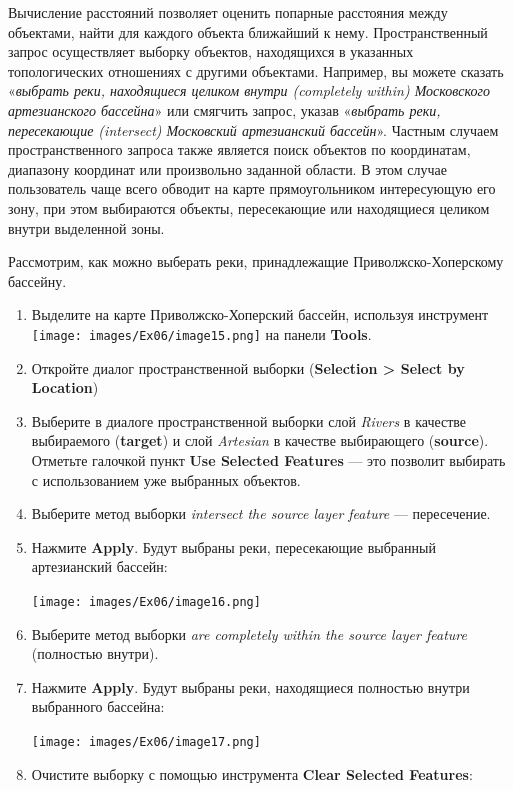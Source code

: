 \documentclass[12pt,]{book}
\begin{document}
Вычисление расстояний позволяет оценить попарные расстояния между объектами, найти для каждого объекта ближайший к нему. Пространственный запрос осуществляет выборку объектов, находящихся в указанных топологических отношениях с другими объектами. Например, вы можете сказать «\emph{выбрать реки, находящиеся целиком внутри (completely within) Московского артезианского бассейна}» или смягчить запрос, указав «\emph{выбрать реки, пересекающие (intersect) Московский артезианский бассейн}». Частным случаем пространственного запроса также является поиск объектов по координатам, диапазону координат или произвольно заданной области. В этом случае пользователь чаще всего обводит на карте прямоугольником интересующую его зону, при этом выбираются объекты, пересекающие или находящиеся целиком внутри выделенной зоны.

Рассмотрим, как можно выберать реки, принадлежащие Приволжско-Хоперскому бассейну.

\begin{enumerate}
\def\labelenumi{\arabic{enumi}.}
\item
  Выделите на карте Приволжско-Хоперский бассейн, используя инструмент \texttt{[image: images/Ex06/image15.png]} на панели \textbf{Tools}.
\item
  Откройте диалог пространственной выборки (\textbf{Selection \textgreater{} Select by Location})
\item
  Выберите в диалоге пространственной выборки слой \emph{Rivers} в качестве выбираемого (\textbf{target}) и слой \emph{Artesian} в качестве выбирающего (\textbf{source}). Отметьте галочкой пункт \textbf{Use Selected Features} --- это позволит выбирать с использованием уже выбранных объектов.
\item
  Выберите метод выборки \emph{intersect the source layer feature} --- пересечение.
\item
  Нажмите \textbf{Apply}. Будут выбраны реки, пересекающие выбранный артезианский бассейн:

  \texttt{[image: images/Ex06/image16.png]}
\item
  Выберите метод выборки \emph{are completely within the source layer feature} (полностью внутри).
\item
  Нажмите \textbf{Apply}. Будут выбраны реки, находящиеся полностью внутри выбранного бассейна:

  \texttt{[image: images/Ex06/image17.png]}
\item
  Очистите выборку с помощью инструмента \textbf{Clear Selected Features}:
\end{enumerate}
\end{document}
